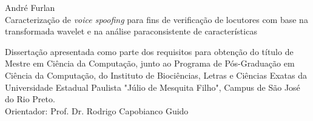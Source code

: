 \vspace{4cm}
\fontsize{14}{\baselineskip} 
\selectfont
\vspace{30.0pt}
{André Furlan} \\ \vspace{30.0pt}
{Caracterização de \textit{voice spoofing} para fins de verificação de locutores com base na transformada wavelet e na análise paraconsistente de características} \\ \onehalfspacing 

\fontsize{14}{\baselineskip} \selectfont
\par \null
\begin{flushright}
\parbox{3.50in}{
	\fontsize{12}{\baselineskip} \selectfont \onehalfspacing

Dissertação apresentada como parte dos requisitos para obtenção do título de Mestre em Ciência da Computação, junto ao Programa de Pós-Graduação em Ciência da Computação, do
Instituto de Biociências, Letras e Ciências Exatas da Universidade Estadual Paulista "Júlio de Mesquita Filho", Campus de São José do Rio Preto.\\ \vspace{1.0pt}
	{Orientador: Prof. Dr. Rodrigo Capobianco Guido } \\ \vspace{1.0pt}
}
\end{flushright}